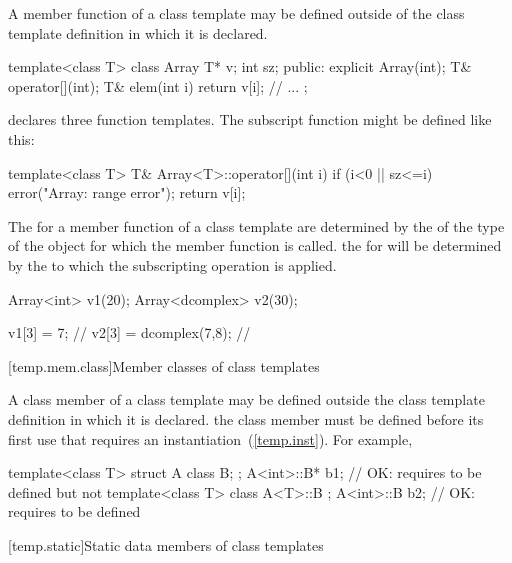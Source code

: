 \pnum
{}%
A member function
of a class template
may be defined outside of the class
template definition in which it is declared.
\enterexample

\begin{codeblock}
template<class T> class Array {
    T* v;
    int sz;
public:
    explicit Array(int);
    T& operator[](int);
    T& elem(int i) { return v[i]; }
    // ...
};
\end{codeblock}

declares three function templates.
The subscript function might be defined like this:

\begin{codeblock}
template<class T> T& Array<T>::operator[](int i)
{
    if (i<0 || sz<=i) error("Array: range error");
    return v[i];
}
\end{codeblock}
\exitexampleb

\pnum
The
for a member function of a class template are determined by the
of the type of the object for which the member function is called.
\enterexample
the
for
will be determined by the
to which the subscripting operation is applied.

\begin{codeblock}
Array<int> v1(20);
Array<dcomplex> v2(30);

v1[3] = 7;                      // 
v2[3] = dcomplex(7,8);          // 
\end{codeblock}
\exitexampleb

[temp.mem.class]{Member classes of class templates}

\pnum
A class member of a class template may be defined outside the class template
definition in which it is declared.
\enternote
the class member must be defined before its first use that requires
an instantiation~(\ref{temp.inst}).
For example,

\begin{codeblock}
template<class T> struct A {
	class B;
};
A<int>::B* b1;                  // OK: requires  to be defined but not 
template<class T> class A<T>::B { };
A<int>::B  b2;                  // OK: requires  to be defined
\end{codeblock}
\exitnoteb

[temp.static]{Static data members of class templates}

